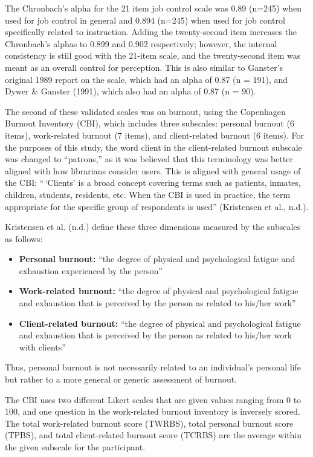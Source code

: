 \documentclass[
  twocolumn]{article}
\providecommand{\tightlist}{%
  \setlength{\itemsep}{0pt}\setlength{\parskip}{0pt}}\usepackage{longtable,booktabs,array}
\begin{document}
The Chronbach's alpha for the 21 item job control scale was 0.89 (n=245)
when used for job control in general and 0.894 (n=245) when used for job
control specifically related to instruction. Adding the twenty-second
item increases the Chronbach's alphas to 0.899 and 0.902 respectively;
however, the internal consistency is still good with the 21-item scale,
and the twenty-second item was meant as an overall control for
perception. This is also similar to Ganster's original 1989 report on
the scale, which had an alpha of 0.87 (n = 191), and Dywer \& Ganster
(1991), which also had an alpha of 0.87 (n = 90).

The second of these validated scales was on burnout, using the
Copenhagen Burnout Inventory (CBI), which includes three subscales:
personal burnout (6 items), work-related burnout (7 items), and
client-related burnout (6 items). For the purposes of this study, the
word client in the client-related burnout subscale was changed to
``patrons,'' as it was believed that this terminology was better aligned
with how librarians consider users. This is aligned with general usage
of the CBI: ``\,`Clients' is a broad concept covering terms such as
patients, inmates, children, students, residents, etc. When the CBI is
used in practice, the term appropriate for the specific group of
respondents is used'' (Kristensen et al., n.d.).

Kristensen et al. (n.d.) define these three dimensions measured by the
subscales as follows:

\begin{itemize}
\tightlist
\item
  \textbf{Personal burnout:} ``the degree of physical and psychological
  fatigue and exhaustion experienced by the person''
\item
  \textbf{Work-related burnout:} ``the degree of physical and
  psychological fatigue and exhaustion that is perceived by the person
  as related to his/her work''
\item
  \textbf{Client-related burnout:} ``the degree of physical and
  psychological fatigue and exhaustion that is perceived by the person
  as related to his/her work with clients''
\end{itemize}

Thus, personal burnout is not necessarily related to an individual's
personal life but rather to a more general or generic assessment of
burnout.

The CBI uses two different Likert scales that are given values ranging
from 0 to 100, and one question in the work-related burnout inventory is
inversely scored. The total work-related burnout score (TWRBS), total
personal burnout score (TPBS), and total client-related burnout score
(TCRBS) are the average within the given subscale for the participant.
\end{document}
